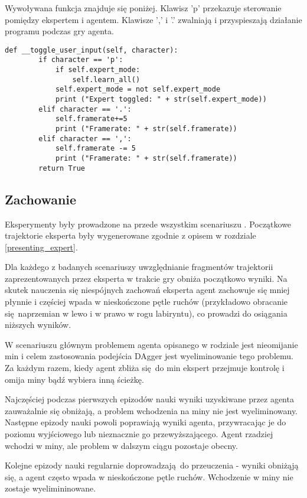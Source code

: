 Wywoływana funkcja znajduje się poniżej. Klawisz 'p' przekazuje sterowanie pomiędzy ekspertem i agentem. Klawisze ',' i '.' zwalniają i przyspieszają działanie programu podczas gry agenta.

\begin{lstlisting}[language=iPython]
    def __toggle_user_input(self, character):
        if character == 'p':
            if self.expert_mode:
                self.learn_all()
            self.expert_mode = not self.expert_mode
            print ("Expert toggled: " + str(self.expert_mode))
        elif character == '.':
            self.framerate+=5
            print ("Framerate: " + str(self.framerate))
        elif character == ',':
            self.framerate -= 5
            print ("Framerate: " + str(self.framerate))
        return True
\end{lstlisting}

\subsection{Zachowanie}
Eksperymenty były prowadzone na przede wszystkim scenariuszu . Początkowe trajektorie eksperta były wygenerowane zgodnie z opisem w rozdziale \ref{presenting_expert}.

Dla każdego z badanych scenariuszy uwzględnianie fragmentów trajektorii zaprezentowanych przez eksperta w trakcie gry obniża początkowo wyniki. Na skutek nauczenia się niespójnych zachowań eksperta agent zachowuje się mniej płynnie i częściej wpada w nieskończone pętle ruchów (przykładowo obracanie się naprzemian w lewo i w prawo w rogu labiryntu), co prowadzi do osiągania niższych wyników.

W scenariuszu  głównym problemem agenta opisanego w rodziale  jest nieomijanie min i celem zastosowania podejścia DAgger jest wyeliminowanie tego problemu. Za każdym razem, kiedy agent zbliża się do min ekspert przejmuje kontrolę i omija miny bądź wybiera inną ścieżkę.

Najczęściej podczas pierwszych epizodów nauki wyniki uzyskiwane przez agenta zauważalnie się obniżają, a problem wchodzenia na miny nie jest wyeliminowany. Następne epizody nauki powoli poprawiają wyniki agenta, przywracając je do poziomu wyjściowego lub nieznacznie go przewyższającego. Agent rzadziej wchodzi w miny, ale problem w dalszym ciągu pozostaje obecny. 

Kolejne epizody nauki regularnie doprowadzają do przeuczenia - wyniki obniżąją się, a agent często wpada w nieskończone pętle ruchów. Wchodzenie w miny nie zostaje wyelimininowane.

